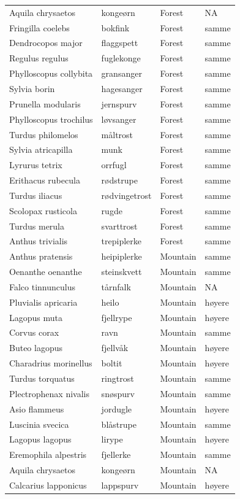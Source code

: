 \documentclass[
  letterpaper,
  DIV=11,
  numbers=noendperiod]{scrartcl}
\begin{document}
\begin{table}
{\begin{xltabular}{\linewidth}{>{\raggedright\arraybackslash}X>{\raggedright\arraybackslash}X>{\raggedright\arraybackslash}X>{\raggedright\arraybackslash}X}
Aquila chrysaetos & kongeørn & Forest & NA\\
Fringilla coelebs & bokfink & Forest & samme\\
Dendrocopos major & flaggspett & Forest & samme\\
\addlinespace
Regulus regulus & fuglekonge & Forest & samme\\
Phylloscopus collybita & gransanger & Forest & samme\\
Sylvia borin & hagesanger & Forest & samme\\
Prunella modularis & jernspurv & Forest & samme\\
Phylloscopus trochilus & løvsanger & Forest & samme\\
\addlinespace
Turdus philomelos & måltrost & Forest & samme\\
Sylvia atricapilla & munk & Forest & samme\\
Lyrurus tetrix & orrfugl & Forest & samme\\
Erithacus rubecula & rødstrupe & Forest & samme\\
Turdus iliacus & rødvingetrost & Forest & samme\\
\addlinespace
Scolopax rusticola & rugde & Forest & samme\\
Turdus merula & svarttrost & Forest & samme\\
Anthus trivialis & trepiplerke & Forest & samme\\
Anthus pratensis & heipiplerke & Mountain & samme\\
Oenanthe oenanthe & steinskvett & Mountain & samme\\
\addlinespace
Falco tinnunculus & tårnfalk & Mountain & NA\\
Pluvialis apricaria & heilo & Mountain & høyere\\
Lagopus muta & fjellrype & Mountain & høyere\\
Corvus corax & ravn & Mountain & samme\\
Buteo lagopus & fjellvåk & Mountain & høyere\\
\addlinespace
Charadrius morinellus & boltit & Mountain & høyere\\
Turdus torquatus & ringtrost & Mountain & samme\\
Plectrophenax nivalis & snøspurv & Mountain & samme\\
Asio flammeus & jordugle & Mountain & høyere\\
Luscinia svecica & blåstrupe & Mountain & samme\\
\addlinespace
Lagopus lagopus & lirype & Mountain & høyere\\
Eremophila alpestris & fjellerke & Mountain & samme\\
Aquila chrysaetos & kongeørn & Mountain & NA\\
Calcarius lapponicus & lappspurv & Mountain & høyere\\
\bottomrule
\end{xltabular}

}

\end{table}%
\end{document}
